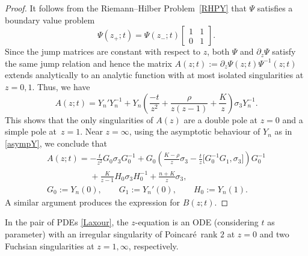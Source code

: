 \documentclass[pdftex]{sigma}
\numberwithin{equation}{section}
\theoremstyle{definition}
\def\le{\left}
\def\ri{\right}
\def\s{\sigma}
\def\pa{\partial}
\begin{document}
\begin{proof}
It follows from the Riemann--Hilber Problem~\ref{RHPY} that $\Psi$ satisfies a boundary value problem
\[%
\Psi(z_+;t) = \Psi(z_-;t) \begin{bmatrix}1 & 1 \\ 0& 1\end{bmatrix}.
\]
Since the jump matrices are constant with respect to $z$, both $\Psi$ and $\pa_z \Psi$ satisfy the same jump relation and hence the matrix
$
A(z;t):= \pa_z\Psi(z;t) \Psi^{-1}(z;t)
$
extends analytically to an analytic function with at most isolated singularities at $z=0,1$.
Thus, we have
\[
A(z;t) = Y_n' Y_n^{-1} + Y_n\le(\frac {-t}{z^2} + \frac{{ {\rho}}}{z(z-1)} + \frac {{ {K}}	}z \ri)\s_3 Y_n^{-1}.
\]
This shows that the only singularities of $A(z)$ are a double pole at $z=0$ and a simple pole at~${z=1}$. Near $z=\infty$, using the asymptotic behaviour of $Y_n$ as in \eqref{asympY}, we conclude that
\begin{gather*}
A(z;t) =-\frac t {z^2} G_0 \s_3 G_0^{-1} + G_0\le(\frac{{ {K}}-{ {\rho}}}z\s_3 - \frac t z \Big[G_0^{-1}G_1, \s_3\Big]\ri) G_0^{-1} \\
\phantom{A(z;t) =}{}+\frac {{ {K}}}{z-1} H_0 \s_3 H_0^{-1} + \frac{n+{ {K}}}z \s_3,\\
G_0 := Y_n(0), \qquad G_1:= Y_n'(0), \qquad H_0 := Y_n(1).
\end{gather*}
A similar argument produces the expression for $B(z;t)$.
\end{proof}

In the pair of PDEs \eqref{Laxour}, the $z$-equation is an ODE (considering $t$ as parameter) with an irregular singularity of Poincar\'e\ rank $2$ at $z=0$ and two Fuchsian singularities at $z=1,\infty$, respectively.
\end{document}
